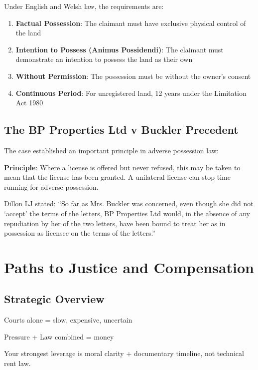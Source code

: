 \documentclass[11pt,a4paper]{article}
\begin{document}
Under English and Welsh law, the requirements are:

\begin{enumerate}[label=\arabic*.]
    \item \textbf{Factual Possession}: The claimant must have exclusive physical control of the land
    \item \textbf{Intention to Possess (Animus Possidendi)}: The claimant must demonstrate an intention to possess the land as their own
    \item \textbf{Without Permission}: The possession must be without the owner's consent
    \item \textbf{Continuous Period}: For unregistered land, 12 years under the Limitation Act 1980
\end{enumerate}

\subsection{The BP Properties Ltd v Buckler Precedent}

The case established an important principle in adverse possession law:

\begin{keyfact}
\textbf{Principle}: Where a license is offered but never refused, this may be taken to mean that the license has been granted. A unilateral license can stop time running for adverse possession.
\end{keyfact}

Dillon LJ stated: ``So far as Mrs. Buckler was concerned, even though she did not `accept' the terms of the letters, BP Properties Ltd would, in the absence of any repudiation by her of the two letters, have been bound to treat her as in possession as licensee on the terms of the letters.''

\newpage

\section{Paths to Justice and Compensation}

\subsection{Strategic Overview}

\begin{tcolorbox}[colback=blue!5,colframe=darkblue,title=\textbf{Strategic Reality}]
Courts alone = slow, expensive, uncertain

Pressure + Law combined = money

Your strongest leverage is moral clarity + documentary timeline, not technical rent law.
\end{tcolorbox}
\end{document}
